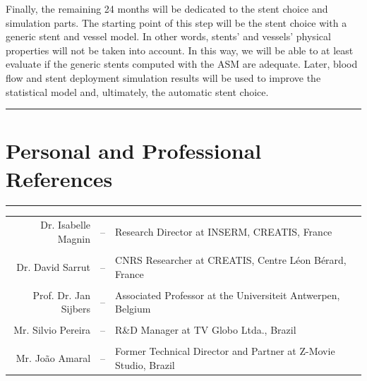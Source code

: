 \documentclass[a4paper]{article}
\begin{document}
Finally, the remaining 24 months will be dedicated to the stent choice and simulation parts. The starting point of this step will be the stent choice with a generic stent and vessel model. In other words, stents' and vessels' physical properties will not be taken into account. In this way, we will be able to at least evaluate if the generic stents computed with the ASM are adequate. Later, blood flow and stent deployment simulation results will be used to improve the statistical model and, ultimately, the automatic stent choice.  




\pagebreak

\medskip
\medskip

\hrule
\section{Personal and Professional References}
\hrule

\medskip
\medskip

\medskip
\medskip

\begin{center}
\begin{tabular}{r c l}
Dr. Isabelle Magnin & -- & Research Director at INSERM, CREATIS, France\\
\\
Dr. David Sarrut & -- & CNRS Researcher at CREATIS, Centre L\'eon B\'erard, France\\
\\
Prof. Dr. Jan Sijbers & -- & Associated Professor at the Universiteit Antwerpen, Belgium \\
\\
Mr. Silvio Pereira & -- & R\&D Manager at TV Globo Ltda., Brazil \\
\\
Mr. Jo\~ao Amaral & -- & Former Technical Director and Partner at Z-Movie Studio, Brazil \\
\end{tabular}
\end{center}
\vfill







\end{document}
